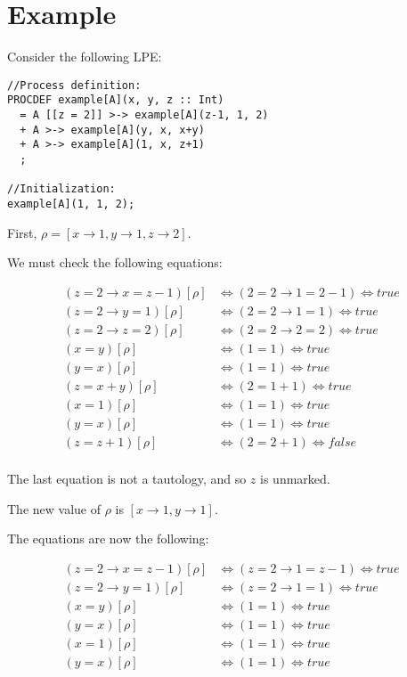 \section{Example}

Consider the following LPE:

\begin{lstlisting}
//Process definition:
PROCDEF example[A](x, y, z :: Int)
  = A [[z = 2]] >-> example[A](z-1, 1, 2)
  + A >-> example[A](y, x, x+y)
  + A >-> example[A](1, x, z+1)
  ;

//Initialization:
example[A](1, 1, 2);
\end{lstlisting}

First, $\rho = [ x \rightarrow 1, y \rightarrow 1, z \rightarrow 2 ]$.

We must check the following equations:

\begin{align*}
(z = 2 \rightarrow x = z-1)[\rho] &\Leftrightarrow (2 = 2 \rightarrow 1 = 2-1) \Leftrightarrow \textit{true} \\
(z = 2 \rightarrow y = 1)[\rho] &\Leftrightarrow (2 = 2 \rightarrow 1 = 1) \Leftrightarrow \textit{true} \\
(z = 2 \rightarrow z = 2)[\rho] &\Leftrightarrow (2 = 2 \rightarrow 2 = 2) \Leftrightarrow \textit{true} \\
(x = y)[\rho] &\Leftrightarrow (1 = 1) \Leftrightarrow \textit{true} \\
(y = x)[\rho] &\Leftrightarrow (1 = 1) \Leftrightarrow \textit{true} \\
(z = x+y)[\rho] &\Leftrightarrow (2 = 1+1) \Leftrightarrow \textit{true} \\
(x = 1)[\rho] &\Leftrightarrow (1 = 1) \Leftrightarrow \textit{true} \\
(y = x)[\rho] &\Leftrightarrow (1 = 1) \Leftrightarrow \textit{true} \\
(z = z+1)[\rho] &\Leftrightarrow (2 = 2+1) \Leftrightarrow \textit{false} \\
\end{align*}

The last equation is not a tautology, and so $z$ is unmarked.

The new value of $\rho$ is $[ x \rightarrow 1, y \rightarrow 1 ]$.

\clearpage
The equations are now the following:

\begin{align*}
(z = 2 \rightarrow x = z-1)[\rho] &\Leftrightarrow (z = 2 \rightarrow 1 = z-1) \Leftrightarrow \textit{true} \\
(z = 2 \rightarrow y = 1)[\rho] &\Leftrightarrow (z = 2 \rightarrow 1 = 1) \Leftrightarrow \textit{true} \\
(x = y)[\rho] &\Leftrightarrow (1 = 1) \Leftrightarrow \textit{true} \\
(y = x)[\rho] &\Leftrightarrow (1 = 1) \Leftrightarrow \textit{true} \\
(x = 1)[\rho] &\Leftrightarrow (1 = 1) \Leftrightarrow \textit{true} \\
(y = x)[\rho] &\Leftrightarrow (1 = 1) \Leftrightarrow \textit{true} \\
\end{align*}


